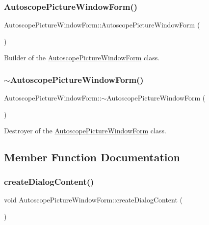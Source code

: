 \subsubsection{\texorpdfstring{AutoscopePictureWindowForm()}{AutoscopePictureWindowForm()}}
{\footnotesize\ttfamily Autoscope\+Picture\+Window\+Form\+::\+Autoscope\+Picture\+Window\+Form (\begin{DoxyParamCaption}{ }\end{DoxyParamCaption})}



Builder of the \mbox{\hyperlink{class_autoscope_picture_window_form}{Autoscope\+Picture\+Window\+Form}} class. 

\mbox{\label{class_autoscope_picture_window_form_a0ac8bae5bd9b170aea179812f0f516be}} 
\subsubsection{\texorpdfstring{$\sim$AutoscopePictureWindowForm()}{~AutoscopePictureWindowForm()}}
{\footnotesize\ttfamily Autoscope\+Picture\+Window\+Form\+::$\sim$\+Autoscope\+Picture\+Window\+Form (\begin{DoxyParamCaption}{ }\end{DoxyParamCaption})}



Destroyer of the \mbox{\hyperlink{class_autoscope_picture_window_form}{Autoscope\+Picture\+Window\+Form}} class. 



\subsection{Member Function Documentation}
\mbox{\label{class_autoscope_picture_window_form_a3014c48f6c7e48455f8908ca3f9acbbc}} 
\subsubsection{\texorpdfstring{createDialogContent()}{createDialogContent()}}
{\footnotesize\ttfamily void Autoscope\+Picture\+Window\+Form\+::create\+Dialog\+Content (\begin{DoxyParamCaption}{ }\end{DoxyParamCaption})\hspace{0.3cm}{\ttfamily [protected]}}



